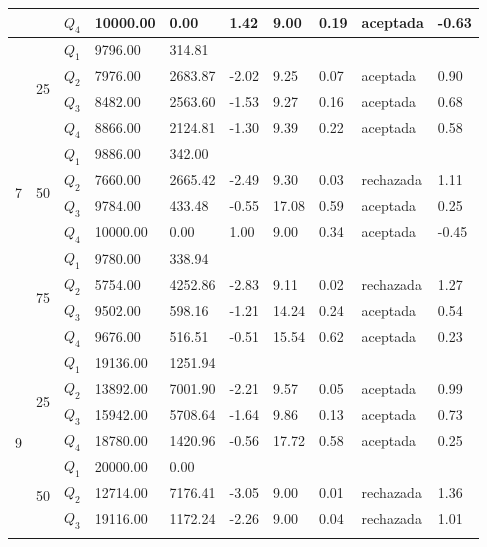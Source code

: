 \begin{table}[]
\begin{tabular}{|l|l|l|l|l|l|l|l|l|l|}
 &  & $Q_4$ & 10000.00 & 0.00 & 1.42 & 9.00 & 0.19 & aceptada & -0.63 \\ \hline
\multirow{12}{*}{7} & \multirow{4}{*}{25} & $Q_1$ & 9796.00 & 314.81 & \multicolumn{5}{l|}{} \\ \cline{3-10} 
 &  & $Q_2$ & 7976.00 & 2683.87 & -2.02 & 9.25 & 0.07 & aceptada & 0.90 \\ \cline{3-10} 
 &  & $Q_3$ & 8482.00 & 2563.60 & -1.53 & 9.27 & 0.16 & aceptada & 0.68 \\ \cline{3-10} 
 &  & $Q_4$ & 8866.00 & 2124.81 & -1.30 & 9.39 & 0.22 & aceptada & 0.58 \\ \cline{2-10} 
 & \multirow{4}{*}{50} & $Q_1$ & 9886.00 & 342.00 & \multicolumn{5}{l|}{} \\ \cline{3-10} 
 &  & $Q_2$ & 7660.00 & 2665.42 & -2.49 & 9.30 & 0.03 & rechazada & 1.11 \\ \cline{3-10} 
 &  & $Q_3$ & 9784.00 & 433.48 & -0.55 & 17.08 & 0.59 & aceptada & 0.25 \\ \cline{3-10} 
 &  & $Q_4$ & 10000.00 & 0.00 & 1.00 & 9.00 & 0.34 & aceptada & -0.45 \\ \cline{2-10} 
 & \multirow{4}{*}{75} & $Q_1$ & 9780.00 & 338.94 & \multicolumn{5}{l|}{} \\ \cline{3-10} 
 &  & $Q_2$ & 5754.00 & 4252.86 & -2.83 & 9.11 & 0.02 & rechazada & 1.27 \\ \cline{3-10} 
 &  & $Q_3$ & 9502.00 & 598.16 & -1.21 & 14.24 & 0.24 & aceptada & 0.54 \\ \cline{3-10} 
 &  & $Q_4$ & 9676.00 & 516.51 & -0.51 & 15.54 & 0.62 & aceptada & 0.23 \\ \hline
\multirow{12}{*}{9} & \multirow{4}{*}{25} & $Q_1$ & 19136.00 & 1251.94 & \multicolumn{5}{l|}{} \\ \cline{3-10} 
 &  & $Q_2$ & 13892.00 & 7001.90 & -2.21 & 9.57 & 0.05 & aceptada & 0.99 \\ \cline{3-10} 
 &  & $Q_3$ & 15942.00 & 5708.64 & -1.64 & 9.86 & 0.13 & aceptada & 0.73 \\ \cline{3-10} 
 &  & $Q_4$ & 18780.00 & 1420.96 & -0.56 & 17.72 & 0.58 & aceptada & 0.25 \\ \cline{2-10} 
 & \multirow{4}{*}{50} & $Q_1$ & 20000.00 & 0.00 & \multicolumn{5}{l|}{} \\ \cline{3-10} 
 &  & $Q_2$ & 12714.00 & 7176.41 & -3.05 & 9.00 & 0.01 & rechazada & 1.36 \\ \cline{3-10} 
 &  & $Q_3$ & 19116.00 & 1172.24 & -2.26 & 9.00 & 0.04 & rechazada & 1.01 \\ \cline{3-10} 

\end{tabular}
\end{table}
